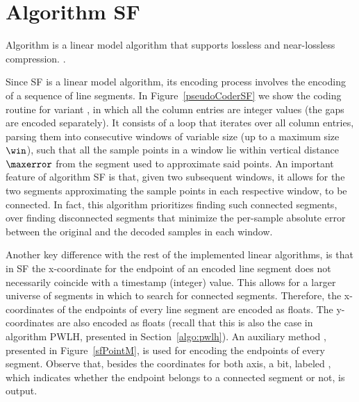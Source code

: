 

\section{Algorithm SF}
\label{algo:sf}


Algorithm \textit{\SFfull} \cite{coder:sf} is a linear model algorithm that supports lossless and near-lossless compression. \WindowParam {}.


Since SF is a linear model algorithm, its encoding process involves the encoding of a sequence of line segments. In Figure~\ref{pseudoCoderSF} we show the coding routine for variant \maskalgo, in which all the column entries are integer values (the gaps are encoded separately). It consists of a loop that iterates over all column entries, parsing them into consecutive windows of variable size (up to a maximum size~$\win$), such that all the sample points in a window lie within vertical distance $\maxerror$ from the segment used to approximate said points. An important feature of algorithm SF is that, given two subsequent windows, it allows for the two segments approximating the sample points in each respective window, to be connected. In fact, this algorithm prioritizes finding such connected segments, over finding disconnected segments that minimize the per-sample absolute error between the original and the decoded samples in each window. 


\vspace{+5pt}



\clearpage


Another key difference with the rest of the implemented linear algorithms, is that in SF the x-coordinate for the endpoint of an encoded line segment does not necessarily coincide with a timestamp (integer) value. This allows for a larger universe of segments in which to search for connected segments. Therefore, the x-coordinates of the endpoints of every line segment are encoded as floats. The y-coordinates are also encoded as floats (recall that this is also the case in algorithm PWLH, presented in Section~\ref{algo:pwlh}). An auxiliary method \SFEncodePoint, presented in Figure~\ref{sfPointM}, is used for encoding the endpoints of every segment. Observe that, besides the coordinates for both axis, a bit, labeled \connectedS, which indicates whether the endpoint belongs to a connected segment or not, is output.


\vspace{-2pt}



